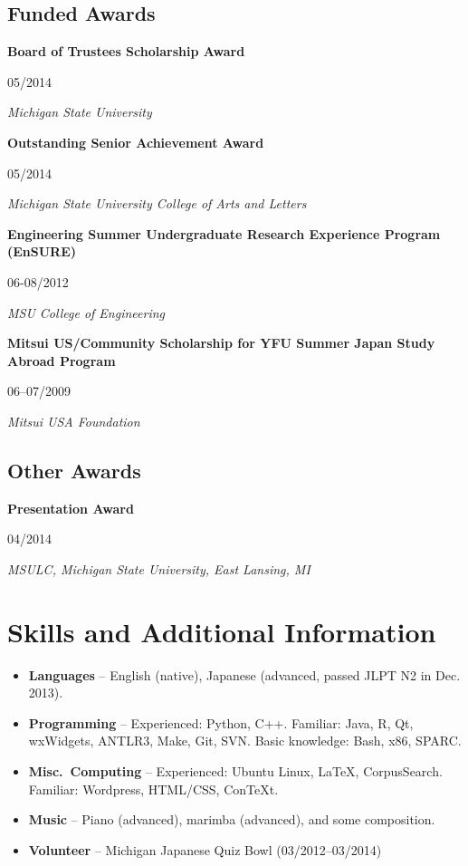 \documentclass[10pt,oneside]{article}
\newcommand{\ressection}[1]{
	\vspace{-12pt}
	\section*{#1}
}
\newcommand{\ressubsection}[1]{
	\subsection*{#1}
	\vspace{-4pt}
}
\newcommand{\resitem}[2]{
	\item \parbox[t]{0.8\textwidth}{#1} \hfill #2
}
\newcommand{\resbigitem}[4]{
	\item \parbox[t]{0.8\textwidth}{\textbf{#1}} \hfill #2 \\
		\parbox[t]{0.8\textwidth}{\textit{#3}} \hfill \textit{#4}
}
\begin{document}
\ressubsection{Funded Awards}
\begin{reslist}
	\resbigitem{Board of Trustees Scholarship Award}
		{05/2014}
		{Michigan State University}
		{}
	\resbigitem{Outstanding Senior Achievement Award}
		{05/2014}
		{Michigan State University College of Arts and Letters }
		{}
	\resbigitem{Engineering Summer Undergraduate Research Experience Program (EnSURE)}
		{06-08/2012}
		{MSU College of Engineering}
		{}
	\resbigitem{Mitsui US/Community Scholarship for YFU Summer Japan Study Abroad Program}
		{06--07/2009}
		{Mitsui USA Foundation}
		{}
\end{reslist}

\ressubsection{Other Awards}
\begin{reslist}
	\resbigitem{Presentation Award}
		{04/2014}
		{MSULC, Michigan State University, East Lansing, MI}
		{}
\end{reslist}



\ressection{Skills and Additional Information}

\begin{itemize}
	\item \textbf{Languages} -- English (native), Japanese (advanced, passed JLPT N2 in Dec. 2013).
	
	\item \textbf{Programming} -- Experienced: Python, C++. Familiar: Java, R, Qt, wxWidgets, ANTLR3, Make, Git, SVN. Basic knowledge: Bash, x86, SPARC.
	
	\item \textbf{Misc.\ Computing} -- Experienced: Ubuntu Linux, \LaTeX{}, CorpusSearch. Familiar: Wordpress, HTML/CSS, ConTeXt.
	
	\item \textbf{Music} --  Piano (advanced), marimba (advanced), and some composition.
	
	\item \textbf{Volunteer} -- Michigan Japanese Quiz Bowl (03/2012--03/2014)
\end{itemize}
\end{document}
